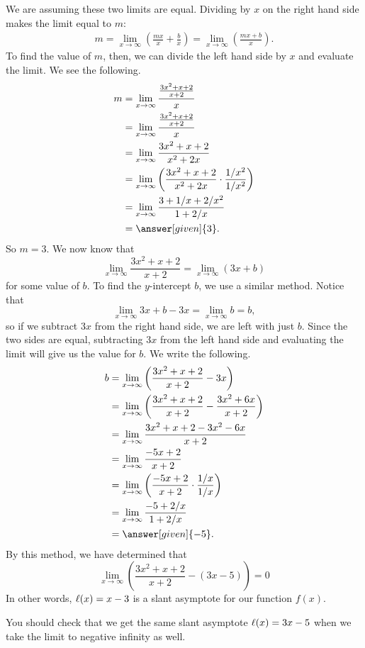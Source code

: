 \documentclass{ximera}
\begin{document}
\begin{example}
\begin{explanation}
    We are assuming these two limits are equal.  Dividing by $x$ on the right hand side makes the limit equal to $m$:
    \begin{align*}
    m = \lim_{x \to \infty} \left(\frac{mx}{x} + \frac{b}{x}\right) = \lim_{x \to \infty} \left(\frac{mx+b}{x}\right).
    \end{align*}
    To find the value of $m$, then, we can divide the left hand side by $x$ and evaluate the limit.   We see the following. 
    \begin{align*}
      m &=\lim_{x\to\infty}\frac{\frac{3x^2+x+2}{x+2}}{x}\\
      &= \lim_{x\to\infty}\frac{\frac{3x^2+x+2}{x+2}}{x}\\
      &= \lim_{x\to\infty}\frac{3x^2+x+2}{x^2+2x}\\
      &= \lim_{x\to\infty}\left(\frac{3x^2+x+2}{x^2+2x}\cdot\frac{1/x^2}{1/x^2}\right)\\
      &= \lim_{x\to\infty}\frac{3+1/x+2/x^2}{1+2/x}\\
      &= \answer[given]{3}.
    \end{align*}
    So $m=3$.  We now know that
    \[
    \lim_{x \to \infty}\frac{3x^2 +x+2}{x+2} = \lim_{x \to \infty} (3x + b)
    \]
    for some value of $b$.  To find the $y$-intercept $b$, we use a similar method.  Notice that
    \[
    \lim_{x \to \infty} 3x + b - 3x = \lim_{x \to \infty} b = b,
    \]
    so if we subtract $3x$ from the right hand side, we are left with just $b$.  Since the two sides are equal, subtracting $3x$ from the left hand side and evaluating the limit will give us the value for $b$.  We write the following.
    \begin{align*}
      b &=\lim_{x\to\infty} \left(\frac{3x^2+x+2}{x+2} - 3x\right)\\
      &=\lim_{x\to\infty} \left( \frac{3x^2+x+2}{x+2} - \frac{3x^2 + 6x}{x+2}\right) \\
      &=\lim_{x\to\infty} \frac{3x^2+x+2-3x^2-6x}{x+2}\\
      &=\lim_{x\to\infty}  \frac{-5x+2}{x+2}\\
      &=\lim_{x\to\infty} \left(\frac{-5x+2}{x+2}\cdot\frac{1/x}{1/x}\right)\\
      &=\lim_{x\to\infty} \frac{-5+2/x}{1+2/x}\\
      &= \answer[given]{-5}.
    \end{align*}
    By this method, we have determined that 
    \[
    \lim_{x\to\infty}\left(\frac{3x^2+x+2}{x+2} - (3x-5) \right) = 0
    \]
   In other words, $\ell(x) = x-3$ is a slant asymptote for our function $f(x)$.  
   
   You should check that we get the same slant asymptote $\ell(x) = 3x-5$ when we take the limit to negative infinity as well.
  \end{explanation}
\end{example}
\end{document}
